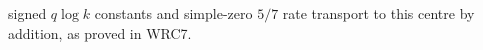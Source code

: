 signed $q\log k$ constants and simple-zero $5/7$ rate
transport to this centre by addition, as proved in WRC7.